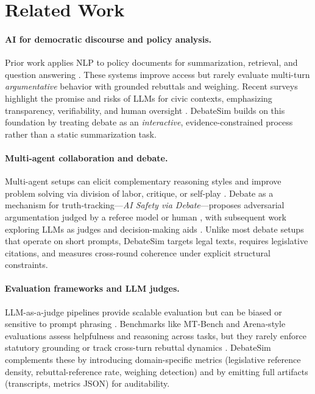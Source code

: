 \documentclass{article}
\begin{document}
\section{Related Work}

\paragraph{AI for democratic discourse and policy analysis.}
Prior work applies NLP to policy documents for summarization, retrieval, and question answering \citep{Kornilova2019BillSum,Smith2024NLPPolicy,Johnson2023AutomatedLegis,LegalBench2023}. These systems improve access but rarely evaluate multi-turn \emph{argumentative} behavior with grounded rebuttals and weighing. Recent surveys highlight the promise and risks of LLMs for civic contexts, emphasizing transparency, verifiability, and human oversight \citep{Wang2023AIpolicyReview,Bai2022ConstitutionalAI}. DebateSim builds on this foundation by treating debate as an \emph{interactive}, evidence-constrained process rather than a static summarization task.

\paragraph{Multi-agent collaboration and debate.}
Multi-agent setups can elicit complementary reasoning styles and improve problem solving via division of labor, critique, or self-play \citep{Li2023CAMEL,Park2023GenerativeAgents,Shinn2023Reflexion}. Debate as a mechanism for truth-tracking—\emph{AI Safety via Debate}—proposes adversarial argumentation judged by a referee model or human \citep{Irving2018AISafetyDebate}, with subsequent work exploring LLMs as judges \citep{Zheng2023JudgingLLMs} and decision-making aids \citep{Kadavath2022KnowWhatTheyKnow}. Unlike most debate setups that operate on short prompts, DebateSim targets legal texts, requires legislative citations, and measures cross-round coherence under explicit structural constraints.

\paragraph{Evaluation frameworks and LLM judges.}
LLM-as-a-judge pipelines provide scalable evaluation but can be biased or sensitive to prompt phrasing \citep{Zheng2023JudgingLLMs,Bai2022ConstitutionalAI}. Benchmarks like MT-Bench and Arena-style evaluations assess helpfulness and reasoning across tasks, but they rarely enforce statutory grounding or track cross-turn rebuttal dynamics \citep{Zheng2023JudgingLLMs}. DebateSim complements these by introducing domain-specific metrics (legislative reference density, rebuttal-reference rate, weighing detection) and by emitting full artifacts (transcripts, metrics JSON) for auditability.
\end{document}
